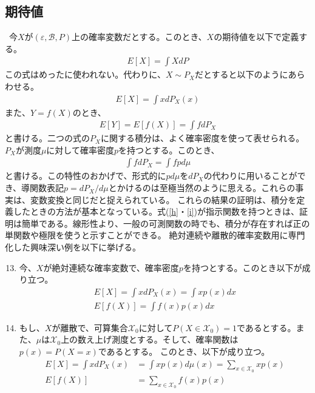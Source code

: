 \documentclass[a4j,12pt]{jarticle}
\begin{document}
\subsection{期待値}
\ 今$X$が$(\varepsilon,\mathcal{B},P)$上の確率変数だとする。このとき、$X$の期待値を以下で定義する。
\begin{align}
\label{j}
E[X] = \int X dP
\end{align}
この式はめったに使われない。代わりに、$X \sim P_{X}$だとすると以下のようにあらわせる。
\begin{align}
\label{g}
E[X] = \int x dP_{X}(x)
\end{align}
また、$Y = f(X)$のとき、
\begin{align}
\label{h}
E[Y] = E[f(X)] = \int f dP_{X}
\end{align}
と書ける。二つの式の$P_{X}$に関する積分は、よく確率密度を使って表せられる。$P_{X}$が測度$\mu$に対して確率密度$p$を持つとする。このとき、
\begin{align}
\label{i}
\int f dP_{X} = \int fpd\mu
\end{align}
と書ける。この特性のおかげで、形式的に$pd\mu$を$dP_{X}$の代わりに用いることができ、導関数表記$p = dP_{X}/d\mu$とかけるのは至極当然のように思える。これらの事実は、変数変換と同じだと捉えられている。
これらの結果の証明は、積分を定義したときの方法が基本となっている。式(\ref{h}・\ref{i})が指示関数を持つときは、証明は簡単である。線形性より、一般の可測関数の時でも、積分が存在すれば正の単関数や極限を使うと示すことができる。
絶対連続や離散的確率変数用に専門化した興味深い例を以下に挙げる。
\begin{enumerate}[label = 例1. \arabic*]
\setcounter{enumi}{12}
\item 今、$X$が絶対連続な確率変数で、確率密度$p$を持つとする。このとき以下が成り立つ。
\begin{align}
\label{w}
E[X] = \int x dP_{X}(x) = \int x p(x)dx \nonumber \\
E[f(X)] = \int f(x)p(x)dx
\end{align}
\item もし、$X$が離散で、可算集合$\mathcal{X}_{0}$に対して$P(X \in \mathcal{X}_{0}) = 1$であるとする。また、$\mu$は$\mathcal{X}_{0}$上の数え上げ測度とする。そして、確率関数は$p(x) = P(X = x)$であるとする。
このとき、以下が成り立つ。
\begin{align}
\label{q}
E[X] = \int x dP_{X}(x)& = \int xp(x)d\mu(x)=\sum_{x\in\mathcal{X}_{0}}xp(x) \nonumber \\
E[f(X)] &= \sum_{x\in\mathcal{X}_{0}}f(x)p(x)
\end{align}
\end{enumerate}
\end{document}
